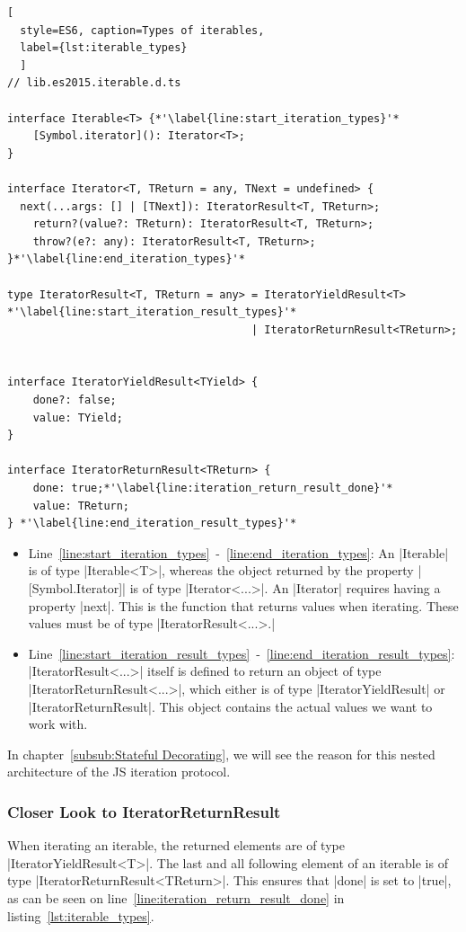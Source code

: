 \begin{lstlisting}[
  style=ES6, caption=Types of iterables,
  label={lst:iterable_types}
  ]
// lib.es2015.iterable.d.ts

interface Iterable<T> {*'\label{line:start_iteration_types}'*
    [Symbol.iterator](): Iterator<T>;
}

interface Iterator<T, TReturn = any, TNext = undefined> {
  next(...args: [] | [TNext]): IteratorResult<T, TReturn>;
    return?(value?: TReturn): IteratorResult<T, TReturn>;
    throw?(e?: any): IteratorResult<T, TReturn>;
}*'\label{line:end_iteration_types}'*

type IteratorResult<T, TReturn = any> = IteratorYieldResult<T> *'\label{line:start_iteration_result_types}'*
                                      | IteratorReturnResult<TReturn>;


interface IteratorYieldResult<TYield> {
    done?: false;
    value: TYield;
}

interface IteratorReturnResult<TReturn> {
    done: true;*'\label{line:iteration_return_result_done}'*
    value: TReturn;
} *'\label{line:end_iteration_result_types}'*
\end{lstlisting}

\begin{itemize}
  \item{Line~\ref{line:start_iteration_types}~-~\ref{line:end_iteration_types}: 
      An |Iterable| is of type |Iterable<T>|, whereas the object returned by the property
      |[Symbol.Iterator]| is of type |Iterator<...>|. An |Iterator| requires having a property |next|. 
      This is the function that returns values when iterating. These values must be 
      of type |IteratorResult<...>.|
    }
  \item{Line~\ref{line:start_iteration_result_types}~-~\ref{line:end_iteration_result_types}:
      |IteratorResult<...>| itself is defined to return an 
      object of type |IteratorReturnResult<...>|, which either is of type
      |IteratorYieldResult| or |IteratorReturnResult|. This object contains the actual 
      values we want to work with.}
\end{itemize}

In chapter~\ref{subsub:Stateful Decorating}, we will see the reason for this
nested architecture of the JS iteration protocol.

\subsubsection{Closer Look to IteratorReturnResult}
\label{subsub:Closer look to IteratorReturnResult}
When iterating an iterable, the returned elements are of type
|IteratorYieldResult<T>|. The last and all following element of an iterable is of type
|IteratorReturnResult<TReturn>|. This ensures that |done| is set to |true|, as 
can be seen on line~\ref{line:iteration_return_result_done} in listing~\ref{lst:iterable_types}.

